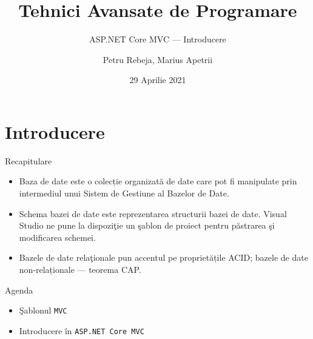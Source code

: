 \documentclass[presentation]{beamer}
\author{Petru Rebeja, Marius Apetrii}
\date{29 Aprilie 2021}
\title{Tehnici Avansate de Programare}
\subtitle{ASP.NET Core MVC --- Introducere}
\institute[UAIC]{Facultatea de Matematică\\Universitatea Alexandru Ioan Cuza, Iași}
\begin{document}
\maketitle
\section{Introducere}
\label{sec:orgfc078e0}
\begin{frame}[label={sec:orge24cdc4}]{Recapitulare}
\pause
\begin{itemize}
\item \alert{Baza de date} este o colecție organizată de date care pot fi manipulate prin intermediul unui \alert{Sistem de Gestiune al Bazelor de Date}.
\end{itemize}
\pause
\begin{itemize}
\item \alert{Schema bazei de date} este reprezentarea structurii bazei de date. Visual Studio ne pune la dispoziţie un şablon de proiect pentru păstrarea şi modificarea schemei.
\end{itemize}
\pause
\begin{itemize}
\item Bazele de date relaţionale pun accentul pe proprietățile \alert{ACID}; bazele de date non-relaționale --- teorema \alert{CAP}.
\end{itemize}
\end{frame}
\begin{frame}[label={sec:orga507381},fragile]{Agenda}
 \begin{itemize}
\item Şablonul \texttt{MVC}
\item Introducere în \texttt{ASP.NET Core MVC}
\end{itemize}
\end{frame}
\end{document}
